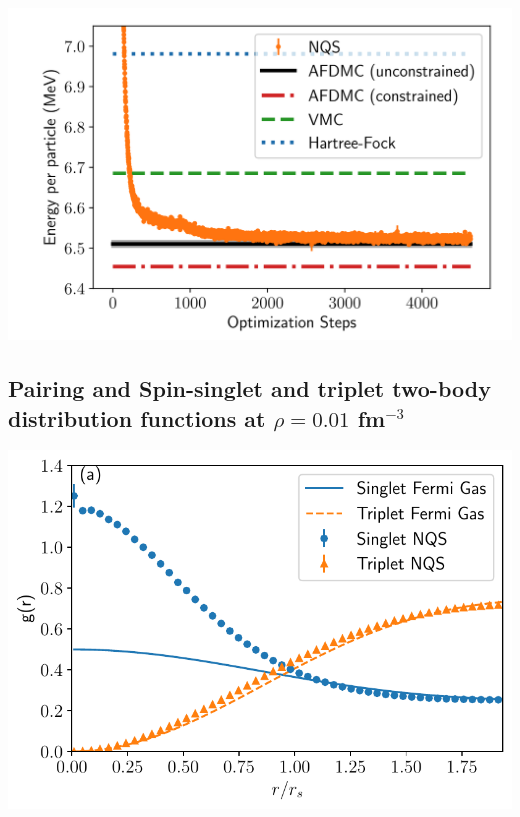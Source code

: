 \documentclass[%
oneside,                 %
final,                   %
10pt]{article}
\begin{document}
\begin{block}{}

\vspace{6mm}

\centerline{\includegraphics[width=0.9\linewidth]{figures/nmatter.png}}

\vspace{6mm}

\end{block}


\subsection{Pairing and Spin-singlet and triplet two-body distribution functions at $\rho=0.01$ fm$^{-3}$}
\begin{block}{}

\vspace{6mm}

\centerline{\includegraphics[width=0.9\linewidth]{figures/01_tbd.pdf}}

\vspace{6mm}

\end{block}
\end{document}
